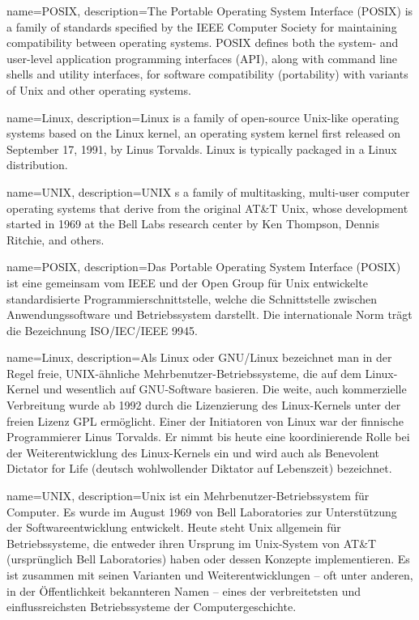
\fi

\ifenglish
	{%
		name={POSIX},
		description={The Portable Operating System Interface (POSIX) is a family of standards specified by the IEEE Computer Society for maintaining compatibility between operating systems. POSIX defines both the system- and user-level application programming interfaces (API), along with command line shells and utility interfaces, for software compatibility (portability) with variants of Unix and other operating systems.}
	}

	{%
		name={Linux},
		description={Linux is a family of open-source Unix-like operating systems based on the Linux kernel, an operating system kernel first released on September 17, 1991, by Linus Torvalds. Linux is typically packaged in a Linux distribution.}
	}

	{%
		name={UNIX},
		description={UNIX s a family of multitasking, multi-user computer operating systems that derive from the original AT&T Unix, whose development started in 1969 at the Bell Labs research center by Ken Thompson, Dennis Ritchie, and others.}
	}

\else

	{%
		name={POSIX},
		description={Das Portable Operating System Interface (POSIX) ist eine gemeinsam vom IEEE und der Open Group für Unix entwickelte standardisierte Programmierschnittstelle, welche die Schnittstelle zwischen Anwendungssoftware und Betriebssystem darstellt. Die internationale Norm trägt die Bezeichnung ISO/IEC/IEEE 9945. }
	}

	{%
		name={Linux},
		description={Als Linux oder GNU/Linux bezeichnet man in der Regel freie, UNIX-ähnliche Mehrbenutzer-Betriebssysteme, die auf dem Linux-Kernel und wesentlich auf GNU-Software basieren. Die weite, auch kommerzielle Verbreitung wurde ab 1992 durch die Lizenzierung des Linux-Kernels unter der freien Lizenz GPL ermöglicht. Einer der Initiatoren von Linux war der finnische Programmierer Linus Torvalds. Er nimmt bis heute eine koordinierende Rolle bei der Weiterentwicklung des Linux-Kernels ein und wird auch als Benevolent Dictator for Life (deutsch wohlwollender Diktator auf Lebenszeit) bezeichnet.}
	}

	{%
		name={UNIX},
		description={Unix ist ein Mehrbenutzer-Betriebssystem für Computer. Es wurde im August 1969 von Bell Laboratories zur Unterstützung der Softwareentwicklung entwickelt. Heute steht Unix allgemein für Betriebssysteme, die entweder ihren Ursprung im Unix-System von AT&T (ursprünglich Bell Laboratories) haben oder dessen Konzepte implementieren. Es ist zusammen mit seinen Varianten und Weiterentwicklungen – oft unter anderen, in der Öffentlichkeit bekannteren Namen – eines der verbreitetsten und einflussreichsten Betriebssysteme der Computergeschichte.}
	}

\fi
